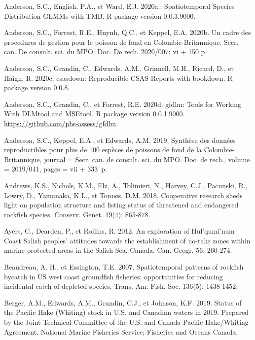 \documentclass[french,11pt]{book}
\begin{document}
\leavevmode\hypertarget{ref-sdmtmb}{}%
Anderson, S.C., English, P.A., et Ward, E.J. 2020a.: Spatiotemporal Species Distribution GLMMs with TMB. R package version 0.0.3.9000.

\leavevmode\hypertarget{ref-anderson2020gfmp}{}%
Anderson, S.C., Forrest, R.E., Huynh, Q.C., et Keppel, E.A. 2020b. Un cadre des procedures de gestion pour le poisson de fond en Colombie-Britannique. Secr. can. De consult. sci. du MPO. Doc. De rech. 2020/007: vi + 150 p.

\leavevmode\hypertarget{ref-csasdown}{}%
Anderson, S.C., Grandin, C., Edwards, A.M., Grinnell, M.H., Ricard, D., et Haigh, R. 2020c. csasdown: Reproducible CSAS Reports with bookdown. R package version 0.0.8.

\leavevmode\hypertarget{ref-gfdlm}{}%
Anderson, S.C., Grandin, C., et Forrest, R.E. 2020d. gfdlm: Tools for Working With DLMtool and MSEtool. R package version 0.0.1.9000. \url{https://github.com/pbs-assess/gfdlm}.

\leavevmode\hypertarget{ref-anderson2019synopsis}{}%
Anderson, S.C., Keppel, E.A., et Edwards, A.M. 2019. Synthèse des données reproductibles pour plus de 100 espèces de poissons de fond de la Colombie-Britannique, journal = Secr. can. de consult. sci. du MPO. Doc. de rech., volume = 2019/041, pages = vii + 333~p.

\leavevmode\hypertarget{ref-andrews2018}{}%
Andrews, K.S., Nichols, K.M., Elz, A., Tolimieri, N., Harvey, C.J., Pacunski, R., Lowry, D., Yamanaka, K.L., et Tonnes, D.M. 2018. Cooperative research sheds light on population structure and listing status of threatened and endangered rockfish species. Conserv. Genet. 19(4): 865‑878.

\leavevmode\hypertarget{ref-ayers2012}{}%
Ayers, C., Dearden, P., et Rollins, R. 2012. An exploration of Hul'qumi'num Coast Salish peoples' attitudes towards the establishment of no-take zones within marine protected areas in the Salish Sea, Canada. Can. Geogr. 56: 260‑274.

\leavevmode\hypertarget{ref-beaudreau2007}{}%
Beaudreau, A. H., et Essington, T.E. 2007. Spatiotemporal patterns of rockfish bycatch in US west coast groundfish fisheries: opportunities for reducing incidental catch of depleted species. Trans. Am. Fish. Soc. 136(5): 1438‑1452.

\leavevmode\hypertarget{ref-berger_2019}{}%
Berger, A.M., Edwards, A.M., Grandin, C.J., et Johnson, K.F. 2019. Status of the Pacific Hake (Whiting) stock in U.S. and Canadian waters in 2019. Prepared by the Joint Technical Committee of the U.S. and Canada Pacific Hake/Whiting Agreement. National Marine Fisheries Service; Fisheries and Oceans Canada.
\end{document}
